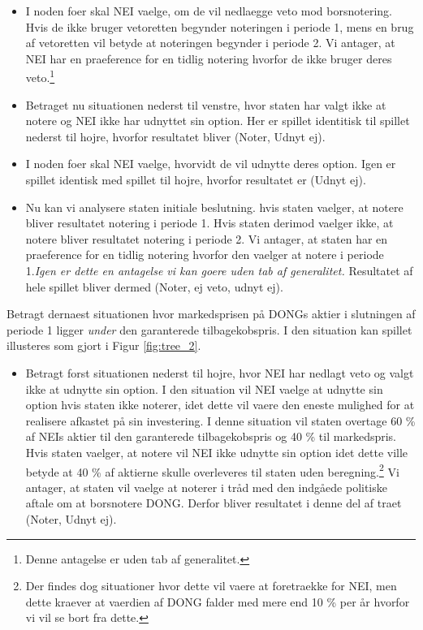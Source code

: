 \documentclass{article}
\begin{document}
\begin{appendices}
\begin{itemize}
			\item I noden foer skal NEI vaelge, om de vil nedlaegge veto mod borsnotering. Hvis de ikke bruger vetoretten begynder noteringen i periode 1, mens en brug af vetoretten vil betyde at noteringen begynder i periode 2. Vi antager, at NEI har en praeference for en tidlig notering hvorfor de ikke bruger deres veto.\footnote{Denne antagelse er uden tab af generalitet.}
	
	\item Betraget nu situationen nederst til venstre, hvor staten har valgt ikke at notere og NEI ikke har udnyttet sin option. Her er spillet identitisk til spillet nederst til hojre, hvorfor resultatet bliver (Noter, Udnyt ej).
	
	\item I noden foer skal NEI vaelge, hvorvidt de vil udnytte deres option. Igen er spillet identisk med spillet til hojre, hvorfor resultatet er (Udnyt ej). 
	
	\item Nu kan vi analysere staten initiale beslutning. hvis staten vaelger, at notere bliver resultatet notering i periode 1. Hvis staten derimod vaelger ikke, at notere bliver resultatet notering i periode 2. Vi antager, at staten har en praeference for en tidlig notering hvorfor den vaelger at notere i periode 1.\emph{Igen er dette en antagelse vi kan goere uden tab af generalitet.} Resultatet af hele spillet bliver dermed (Noter, ej veto, udnyt ej).
 
\end{itemize}

Betragt dernaest situationen hvor markedsprisen på DONGs aktier i slutningen af periode 1 ligger \textit{under} den garanterede tilbagekobspris. I den situation kan spillet illusteres som gjort i Figur \ref{fig:tree_2}.

\begin{itemize}

	\item Betragt forst situationen nederst til hojre, hvor NEI har nedlagt veto og valgt ikke at udnytte sin option. I den situation vil NEI vaelge at udnytte sin option hvis staten ikke noterer, idet dette vil vaere den eneste mulighed for at realisere afkastet på sin investering. I denne situation vil staten overtage 60 \% af NEIs aktier til den garanterede tilbagekobspris og 40 \% til markedspris. Hvis staten vaelger, at notere vil NEI ikke udnytte sin option idet dette ville betyde at 40 \% af aktierne skulle overleveres til staten uden beregning.\footnote{Der findes dog situationer hvor dette vil vaere at foretraekke for NEI, men dette kraever at vaerdien af DONG falder med mere end 10 \% per år hvorfor vi vil se bort fra dette.} Vi antager, at staten vil vaelge at noterer i tråd med den indgåede politiske aftale om at borsnotere DONG. Derfor bliver resultatet i denne del af traet (Noter, Udnyt ej).
	

\end{itemize}
\end{appendices}
\end{document}
